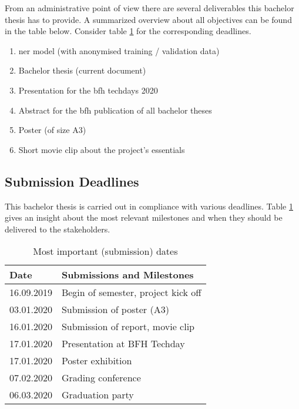 From an administrative point of view there are several deliverables this bachelor thesis has to provide. A summarized overview about all objectives can be found in the table below. Consider table \ref{tbl:deadlines} for the corresponding deadlines.

\begin{enumerate}
    \item \acrshort{ner} model (with anonymised training / validation data)
    \item Bachelor thesis (current document)
    \item Presentation for the \acrshort{bfh} techdays 2020
    \item Abstract for the \acrshort{bfh} publication of all bachelor theses
    \item Poster (of size A3)
    \item Short movie clip about the project's essentials
\end{enumerate}

\subsection{Submission Deadlines}

This bachelor thesis is carried out in compliance with various deadlines. Table \ref{tbl:deadlines} gives an insight about the most relevant milestones and when they should be delivered to the stakeholders.

\begin{table}[ht!]
    \centering
    \begin{tabular}{|l|l|}
        \hline
        \textbf{Date} & \textbf{Submissions and Milestones} \\ [0.5ex]
        \hline
        16.09.2019 & Begin of semester, project kick off \\
        03.01.2020 & Submission of poster (A3) \\
        16.01.2020 & Submission of report, movie clip \\
        17.01.2020 & Presentation at BFH Techday \\
        17.01.2020 & Poster exhibition \\
        07.02.2020 & Grading conference \\
        06.03.2020 & Graduation party \\ [1ex]
        \hline
    \end{tabular}
    \caption{Most important (submission) dates}
    \label{tbl:deadlines}
\end{table}


